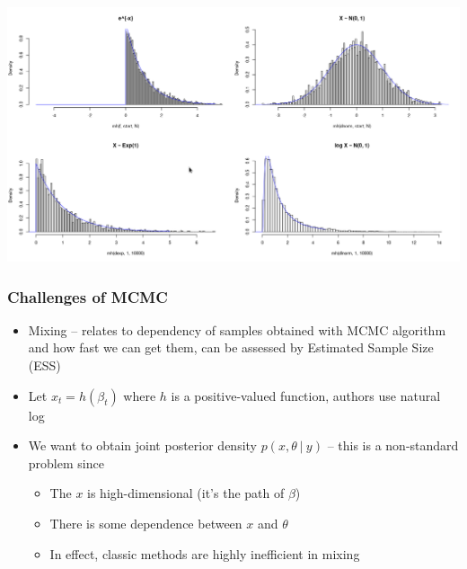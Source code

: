 \documentclass{beamer}
\begin{document}
\begin{frame}[plain]
    \begin{center}
    \includegraphics[width=\linewidth]{mh.png}
    \end{center}
\end{frame}

\begin{frame}
    \frametitle{Challenges of MCMC}
    \begin{itemize}
        \item Mixing -- relates to dependency of samples obtained with MCMC algorithm and how fast we can get them, can be assessed by Estimated Sample Size (ESS)
        \item Let $x_t=h(\beta_t)$ where $h$ is a positive-valued function, authors use natural log
        \item We want to obtain joint posterior density $p(x,\theta\:|\:y)$ -- this is a non-standard problem since
        \begin{itemize}
            \item The $x$ is high-dimensional (it’s the path of $\beta$)
            \item There is some dependence between $x$ and $\theta$
            \item In effect, classic methods are highly inefficient in mixing
        \end{itemize}
    \end{itemize}
\end{frame}
\end{document}

